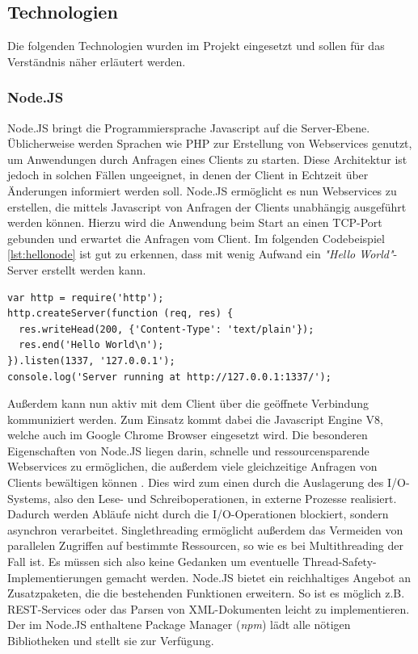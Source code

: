\subsection{Technologien}
\label{subsec:Technologien}
Die folgenden Technologien wurden im Projekt eingesetzt und sollen für das Verständnis näher erläutert werden.

\subsubsection{Node.JS}
\label{subsec:NodeJS}
Node.JS \cite{nodejswebsite} bringt die Programmiersprache Javascript auf die Server-Ebene. Üblicherweise werden Sprachen wie PHP zur Erstellung von Webservices genutzt, um Anwendungen durch Anfragen eines Clients zu starten. Diese Architektur ist jedoch in solchen Fällen ungeeignet, in denen der Client in Echtzeit über Änderungen informiert werden soll. Node.JS ermöglicht es nun Webservices zu erstellen, die mittels Javascript von Anfragen der Clients unabhängig ausgeführt werden können. Hierzu wird die Anwendung beim Start an einen TCP-Port gebunden und erwartet die Anfragen vom Client. Im folgenden Codebeispiel \ref{lst:hellonode} ist gut zu erkennen, dass mit wenig Aufwand ein \textit{"Hello World"}-Server erstellt werden kann.

\begin{lstlisting}
var http = require('http');
http.createServer(function (req, res) {
  res.writeHead(200, {'Content-Type': 'text/plain'});
  res.end('Hello World\n');
}).listen(1337, '127.0.0.1');
console.log('Server running at http://127.0.0.1:1337/');
\end{lstlisting}

Außerdem kann nun aktiv mit dem Client über die geöffnete Verbindung kommuniziert werden. Zum Einsatz kommt dabei die Javascript Engine V8, welche auch im Google Chrome Browser eingesetzt wird. Die besonderen Eigenschaften von Node.JS liegen darin, schnelle und ressourcensparende Webservices zu ermöglichen, die außerdem viele gleichzeitige Anfragen von Clients bewältigen können \cite{cantelon:nodejs}. Dies wird zum einen durch die Auslagerung des I/O-Systems, also den Lese- und Schreiboperationen, in externe Prozesse realisiert. Dadurch werden Abläufe nicht durch die I/O-Operationen blockiert, sondern asynchron verarbeitet. Singlethreading ermöglicht außerdem das Vermeiden von parallelen Zugriffen auf bestimmte Ressourcen, so wie es bei Multithreading der Fall ist. Es müssen sich also keine Gedanken um eventuelle Thread-Safety-Implementierungen gemacht werden. Node.JS bietet ein reichhaltiges Angebot an Zusatzpaketen, die die bestehenden Funktionen erweitern. So ist es möglich z.B. REST-Services oder das Parsen von XML-Dokumenten leicht zu implementieren. Der im Node.JS enthaltene Package Manager (\textit{npm}) lädt alle nötigen Bibliotheken und stellt sie zur Verfügung.

